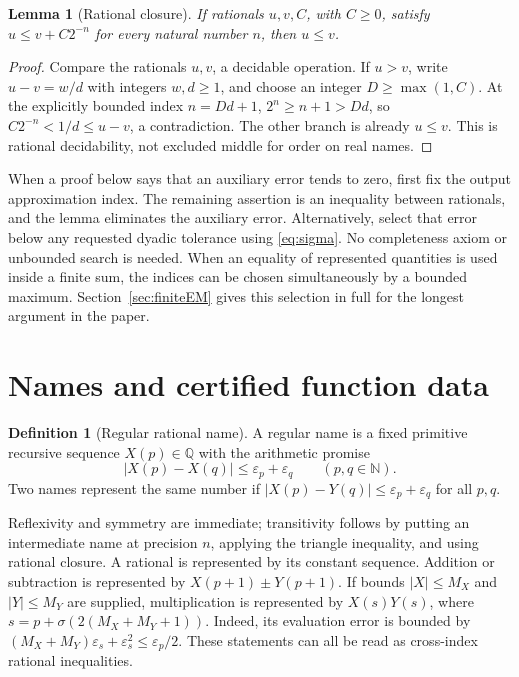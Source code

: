 \documentclass[11pt]{article}
\newtheorem{lemma}[theorem]{Lemma}
\theoremstyle{definition}
\newtheorem{definition}[theorem]{Definition}
\newcommand{\N}{\mathbb N}
\newcommand{\Q}{\mathbb Q}
\newcommand{\eps}{\varepsilon}
\newcommand{\abs}[1]{\left|#1\right|}
\begin{document}
\begin{lemma}[Rational closure]
If rationals \(u,v,C\), with \(C\ge0\), satisfy
\(u\le v+C2^{-n}\) for every natural number \(n\), then \(u\le v\).
\end{lemma}
\begin{proof}
Compare the rationals \(u,v\), a decidable operation.  If \(u>v\), write
\(u-v=w/d\) with integers \(w,d\ge1\), and choose an integer
\(D\ge\max(1,C)\).  At the explicitly bounded index \(n=Dd+1\),
\(2^n\ge n+1>Dd\), so \(C2^{-n}<1/d\le u-v\), a contradiction.
The other branch is already \(u\le v\).  This is rational decidability,
not excluded middle for order on real names.
\end{proof}

When a proof below says that an auxiliary error tends to zero, first
fix the output approximation index.  The remaining assertion is an
inequality between rationals, and the lemma eliminates the auxiliary
error.  Alternatively, select that error below any requested dyadic
tolerance using \eqref{eq:sigma}.  No completeness axiom or unbounded
search is needed.  When an equality of represented quantities is used
inside a finite sum, the indices can be chosen simultaneously by a
bounded maximum.  Section~\ref{sec:finiteEM} gives this selection in full
for the longest argument in the paper.

\section{Names and certified function data}\label{sec:names}

\begin{definition}[Regular rational name]
A regular name is a fixed primitive recursive sequence \(X(p)\in\Q\)
with the arithmetic promise
\begin{equation}
 \abs{X(p)-X(q)}\le\eps_p+\eps_q\qquad(p,q\in\N).\label{eq:name}
\end{equation}
Two names represent the same number if
\(\abs{X(p)-Y(q)}\le\eps_p+\eps_q\) for all \(p,q\).
\end{definition}

Reflexivity and symmetry are immediate; transitivity follows by putting
an intermediate name at precision \(n\), applying the triangle
inequality, and using rational closure.  A rational is represented by
its constant sequence.  Addition or subtraction is represented by
\(X(p+1)\pm Y(p+1)\).  If bounds \(\abs X\le M_X\) and
\(\abs Y\le M_Y\) are supplied, multiplication is represented by
\(X(s)Y(s)\), where
\(s=p+\sigma(2(M_X+M_Y+1))\).  Indeed, its evaluation error is bounded
by \((M_X+M_Y)\eps_s+\eps_s^2\le\eps_p/2\).
These statements can all be read as cross-index rational inequalities.
\end{document}
